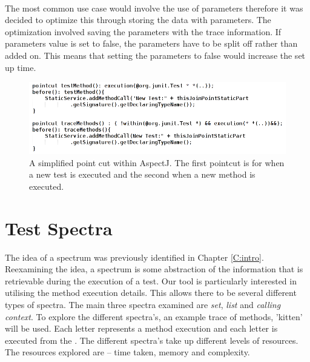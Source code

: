 \paragraph{}
The most common use case would involve the use of parameters therefore it was decided to optimize this through storing the data with parameters. The optimization involved saving the parameters with the trace information. If parameters value is set to false, the parameters have to be split off rather than added on. This means that setting the parameters to false would increase the set up time.

\begin{figure}[h]
\begin{center}
\includegraphics[width = \textwidth]{aspect.png}
\end{center}
\caption{A simplified point cut within AspectJ. The first pointcut is for when a new test is executed and the second when a new method is executed.}
\label{fig:aspectused}
\end{figure}

\section{Test Spectra}
\label{S:spectra}
The idea of a spectrum was previously identified in Chapter \ref{C:intro}. Reexamining the idea, a spectrum is some abstraction of the information that is retrievable during the execution of a test. Our tool is particularly interested in utilising the method execution details. This allows there to be several different types of spectra. The main three spectra examined are \textit{set}, \textit{list} and \textit{calling context}. To explore the different spectra's, an example trace of methods, 'kitten' will be used. Each letter represents a method execution and each letter is executed from the . The different spectra's take up different levels of resources. The resources explored are -- time taken, memory and complexity. 

